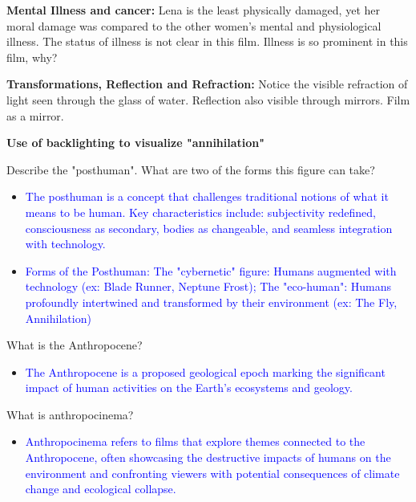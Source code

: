 \documentclass[11pt,fleqn]{book} %
\begin{document}
\textbf{Mental Illness and cancer: }Lena is the least physically damaged, yet her moral damage was compared to the other women's mental and physiological illness. The status of illness is not clear in this film. Illness is so prominent in this film, why?

\textbf{Transformations, Reflection and Refraction: }Notice the visible refraction of light seen through the glass of water. Reflection also visible through mirrors. Film as a mirror.

\textbf{Use of backlighting to visualize "annihilation"}

\begin{exercise}
Describe the "posthuman". What are two of the forms this figure can take?
\begin{itemize}
\item \textcolor{blue}{The posthuman is a concept that challenges traditional notions of what it means to be human. Key characteristics include: subjectivity redefined,  consciousness as secondary, bodies as changeable, and seamless integration with technology.}
\item \textcolor{blue}{Forms of the Posthuman: The "cybernetic" figure: Humans augmented with technology (ex: Blade Runner, Neptune Frost); The "eco-human":  Humans profoundly intertwined and transformed by their environment  (ex:  The Fly,  Annihilation)}
\end{itemize}
\end{exercise}

\begin{exercise}
What is the Anthropocene?
\begin{itemize}
\item \textcolor{blue}{The Anthropocene is a proposed geological epoch marking the significant impact of human activities on the Earth's ecosystems and geology.}
\end{itemize}
\end{exercise}

\begin{exercise}
What is anthropocinema?
\begin{itemize}
\item \textcolor{blue}{Anthropocinema refers to films that explore themes connected to the Anthropocene, often showcasing the destructive impacts of humans on the environment and confronting viewers with potential consequences of  climate change and ecological collapse.}
\end{itemize}
\end{exercise}
\end{document}
